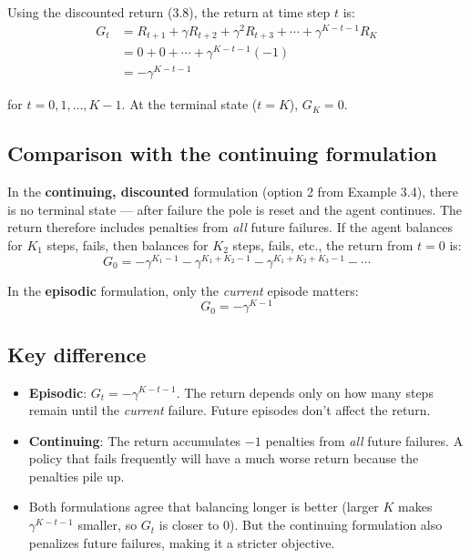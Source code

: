 \documentclass[11pt]{article}
\begin{document}
Using the discounted return (3.8), the return at time step $t$ is:
\begin{align*}
    G_t &= R_{t+1} + \gamma R_{t+2} + \gamma^2 R_{t+3} + \cdots + \gamma^{K-t-1} R_K \\
        &= 0 + 0 + \cdots + \gamma^{K-t-1}(-1) \\
        &= -\gamma^{K-t-1}
\end{align*}

for $t = 0, 1, \ldots, K-1$. At the terminal state ($t = K$), $G_K = 0$.

\subsection*{Comparison with the continuing formulation}

In the \textbf{continuing, discounted} formulation (option 2 from Example 3.4),
there is no terminal state --- after failure the pole is reset and the agent
continues. The return therefore includes penalties from \emph{all} future failures.
If the agent balances for $K_1$ steps, fails, then balances for $K_2$ steps, fails,
etc., the return from $t=0$ is:
\[
    G_0 = -\gamma^{K_1-1} - \gamma^{K_1 + K_2 - 1} - \gamma^{K_1 + K_2 + K_3 - 1} - \cdots
\]

In the \textbf{episodic} formulation, only the \emph{current} episode matters:
\[
    G_0 = -\gamma^{K-1}
\]

\subsection*{Key difference}

\begin{itemize}
    \item \textbf{Episodic}: $G_t = -\gamma^{K-t-1}$. The return depends only on
          how many steps remain until the \emph{current} failure. Future episodes
          don't affect the return.
    \item \textbf{Continuing}: The return accumulates $-1$ penalties from
          \emph{all} future failures. A policy that fails frequently will have
          a much worse return because the penalties pile up.
    \item Both formulations agree that balancing longer is better (larger $K$
          makes $\gamma^{K-t-1}$ smaller, so $G_t$ is closer to 0). But the continuing
          formulation also penalizes future failures, making it a stricter objective.
\end{itemize}
\end{document}
